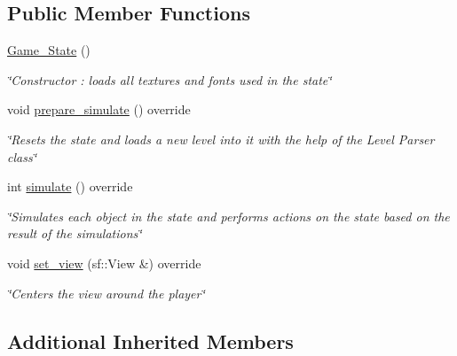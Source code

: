 \subsection*{Public Member Functions}
\begin{DoxyCompactItemize}
\item 
\hypertarget{classGame__State_a8104ef051de61662ee5aef3f63c5d331}{\hyperlink{classGame__State_a8104ef051de61662ee5aef3f63c5d331}{Game\+\_\+\+State} ()}\label{classGame__State_a8104ef051de61662ee5aef3f63c5d331}

\begin{DoxyCompactList}\small\item\em \char`\"{}\+Constructor \+: loads all textures and fonts used in the state\char`\"{} \end{DoxyCompactList}\item 
\hypertarget{classGame__State_a9ad8826703bd8aff5bfeaba29b25e296}{void \hyperlink{classGame__State_a9ad8826703bd8aff5bfeaba29b25e296}{prepare\+\_\+simulate} () override}\label{classGame__State_a9ad8826703bd8aff5bfeaba29b25e296}

\begin{DoxyCompactList}\small\item\em \char`\"{}\+Resets the state and loads a new level into it with the help
        of the Level Parser class\char`\"{} \end{DoxyCompactList}\item 
int \hyperlink{classGame__State_ab45e81cb4c422cd23cd245cd3fb9c87f}{simulate} () override
\begin{DoxyCompactList}\small\item\em \char`\"{}\+Simulates each object in the state and performs actions on
        the state based on the result of the simulations\char`\"{} \end{DoxyCompactList}\item 
void \hyperlink{classGame__State_a1a24aa350628b7f3005e56c5efaadad7}{set\+\_\+view} (sf\+::\+View \&) override
\begin{DoxyCompactList}\small\item\em \char`\"{}\+Centers the view around the player\char`\"{} \end{DoxyCompactList}\end{DoxyCompactItemize}
\subsection*{Additional Inherited Members}


